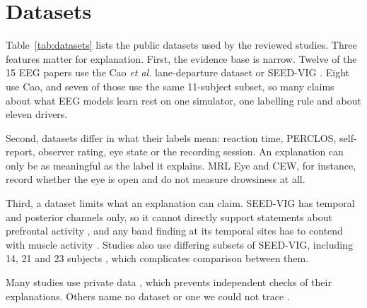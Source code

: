 \section{Datasets}
\label{sec:datasets}

Table~\ref{tab:datasets} lists the public datasets used by the reviewed studies. Three features matter for explanation. First, the evidence base is narrow. Twelve of the 15 EEG papers use the Cao \textit{et al.} lane-departure dataset \cite{cao2019multichannel} or SEED-VIG \cite{zheng2017multimodal}. Eight use Cao, and seven of those use the same 11-subject subset, so many claims about what EEG models learn rest on one simulator, one labelling rule and about eleven drivers.

Second, datasets differ in what their labels mean: reaction time, PERCLOS, self-report, observer rating, eye state or the recording session. An explanation can only be as meaningful as the label it explains. MRL Eye and CEW, for instance, record whether the eye is open and do not measure drowsiness at all.

Third, a dataset limits what an explanation can claim. SEED-VIG has temporal and posterior channels only, so it cannot directly support statements about prefrontal activity \cite{xu2026dynamic}, and any band finding at its temporal sites has to contend with muscle activity \cite{gao2024sftnet}. Studies also use differing subsets of SEED-VIG, including 14, 21 and 23 subjects \cite{gao2025comprehensive,zhou2026sedriven,gao2024sftnet}, which complicates comparison between them.

Many studies use private data \cite{seo2025driver,jiang2026eeg,wu2024driver,gao2025comprehensive,hasan2024validation,puspasari2026predicting,nomura2025drowsiness,zhou2021predicting,zhu2025madfm,guan2025fatigue,zeynalpour2025multimethod}, which prevents independent checks of their explanations. Others name no dataset \cite{jha2025realtime,sasikala2026robust,nayomi2026vision} or one we could not trace \cite{theivadas2025dynamic}.

